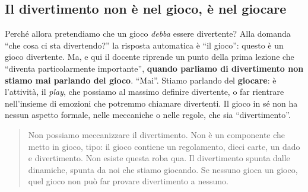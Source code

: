 \subsection{Il divertimento non è nel gioco, è nel giocare}

Perché allora pretendiamo che un gioco \emph{debba} essere divertente? Alla domanda
``che cosa ci sta divertendo?'' la risposta automatica è ``il gioco'': questo è un
gioco divertente. Ma, e qui il docente riprende un punto della prima lezione che
``diventa particolarmente importante'', \textbf{quando parliamo di divertimento non
stiamo mai parlando del gioco}. ``Mai''. Stiamo parlando del \textbf{giocare}:
è l'attività, il \emph{play}, che possiamo al massimo definire divertente, o far
rientrare nell'insieme di emozioni che potremmo chiamare divertenti. Il gioco in sé
non ha nessun aspetto formale, nelle meccaniche o nelle regole, che sia
``divertimento''.

\begin{quote}
Non possiamo meccanizzare il divertimento. Non è un componente che metto in gioco,
tipo: il gioco contiene un regolamento, dieci carte, un dado e divertimento. Non
esiste questa roba qua. Il divertimento spunta dalle dinamiche, spunta da noi che
stiamo giocando. Se nessuno gioca un gioco, quel gioco non può far provare
divertimento a nessuno.
\end{quote}

